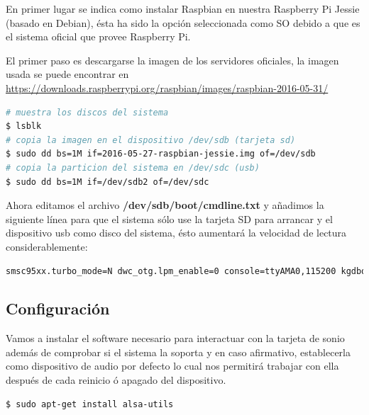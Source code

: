En primer lugar se indica como instalar Raspbian en nuestra Raspberry Pi Jessie (basado en Debian), ésta ha sido la opción seleccionada como SO debido a que es el sistema oficial que provee Raspberry Pi.

\bigskip

El primer paso es descargarse la imagen de los servidores oficiales, la imagen usada se puede encontrar en \url{https://downloads.raspberrypi.org/raspbian/images/raspbian-2016-05-31/}

\begin{lstlisting}[language=bash,caption={Copia de Raspbian en tarjeta s y usb},label={lst:pi1}]
# muestra los discos del sistema
$ lsblk
# copia la imagen en el dispositivo /dev/sdb (tarjeta sd)
$ sudo dd bs=1M if=2016-05-27-raspbian-jessie.img of=/dev/sdb
# copia la particion del sistema en /dev/sdc (usb)
$ sudo dd bs=1M if=/dev/sdb2 of=/dev/sdc
\end{lstlisting}

\bigskip

Ahora editamos el archivo \textbf{/dev/sdb/boot/cmdline.txt} y añadimos la siguiente línea para que el sistema sólo use la tarjeta SD para arrancar y el dispositivo usb como disco del sistema, ésto aumentará la velocidad de lectura considerablemente:


\begin{lstlisting}[language=bash,caption={Modificando el dispositivo de arranque de Raspbian},label={lst:pi2}]
smsc95xx.turbo_mode=N dwc_otg.lpm_enable=0 console=ttyAMA0,115200 kgdboc=ttyAMA0,115200 console=tty1 root=/dev/sda1 rootfstype=ext4 elevator=noop rootwait # /dev/sda1 point to our USB drive
\end{lstlisting}

\bigskip

\subsection{Configuración}

Vamos a instalar el software necesario para interactuar con la tarjeta de sonio además de comprobar si el sistema la soporta y en caso afirmativo, establecerla como dispositivo de audio por defecto lo cual nos permitirá trabajar con ella después de cada reinicio ó apagado del dispositivo.

\begin{lstlisting}[language=bash,caption={Instalación del paquete alsa-utils},label={lst:pi3}]
$ sudo apt-get install alsa-utils
\end{lstlisting}

